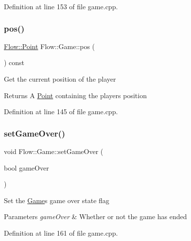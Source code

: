 Definition at line 153 of file game.\+cpp.

\hypertarget{class_flow_1_1_game_a422898b838eb808cf5f5e832a225adb7}{}\label{class_flow_1_1_game_a422898b838eb808cf5f5e832a225adb7} 
\subsubsection{\texorpdfstring{pos()}{pos()}\hspace{0.1cm}{\footnotesize\ttfamily [2/2]}}
{\footnotesize\ttfamily \hyperlink{struct_flow_1_1_point}{Flow\+::\+Point} Flow\+::\+Game\+::pos (\begin{DoxyParamCaption}{ }\end{DoxyParamCaption}) const}

Get the current position of the player \begin{DoxyReturn}{Returns}
A \hyperlink{struct_flow_1_1_point}{Point} containing the player\textquotesingle{}s position 
\end{DoxyReturn}


Definition at line 145 of file game.\+cpp.

\hypertarget{class_flow_1_1_game_a260baa4e54ff4c1862553a39052e3ee0}{}\label{class_flow_1_1_game_a260baa4e54ff4c1862553a39052e3ee0} 
\subsubsection{\texorpdfstring{set\+Game\+Over()}{setGameOver()}}
{\footnotesize\ttfamily void Flow\+::\+Game\+::set\+Game\+Over (\begin{DoxyParamCaption}\item[{bool}]{game\+Over }\end{DoxyParamCaption})}

Set the \hyperlink{class_flow_1_1_game}{Game}\textquotesingle{}s game over state flag 
\begin{DoxyParams}{Parameters}
{\em game\+Over} & Whether or not the game has ended \\
\hline
\end{DoxyParams}


Definition at line 161 of file game.\+cpp.

\hypertarget{class_flow_1_1_game_ab97b20057d0b0952033d47b6f1b0bfe4}{}\label{class_flow_1_1_game_ab97b20057d0b0952033d47b6f1b0bfe4} 

